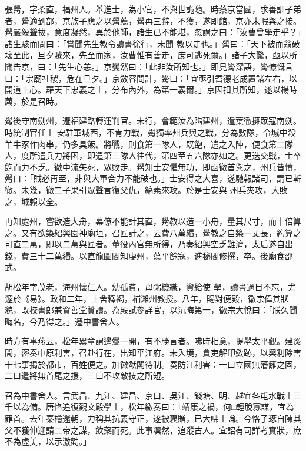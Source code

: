\begin{pinyinscope}
 張觷，字柔直，福州人。舉進士，為小官，不與世詭隨。時蔡京當國，求善訓子弟者，觷適到部，京族子應之以觷薦，觷再三辭，不獲，遂即館，京亦未暇與之接。觷嚴毅聳拔，意度凝然，異於他師，諸生已不能堪，忽謂之曰：「汝曹曾學走乎？」諸生駭而問曰：「嘗聞先生教令讀書徐行，未聞
 教以走也。」觷曰：「天下被而翁破壞至此，旦夕賊來，先至而家，汝曹惟有善走，庶可逃死爾。」諸子大驚，亟以所聞告京，曰：「先生心恙。」京矍然曰：「此非汝所知也。」即見觷深語，觷慷慨言曰：「宗廟社稷，危在旦夕。」京斂容問計，觷曰：「宜亟引耆德老成置諸左右，以開道上心。羅天下忠義之士，分布內外，為第一義爾。」京因扣其所知，遂以楊時薦，於是召時。



 觷後守南劍州，遷福建路轉運判官。未行，會範汝為陷建州，遣葉徹擁眾寇南劍。時統制官任士
 安駐軍城西，不肯力戰，觷獨率州兵與之戰，分為數隊，令城中殺羊牛豕作肉串，仍多具飯。將戰，則食第一隊人，既飽，遣之入陣，便食第二隊人，度所遣兵力將困，即遣第三隊人往代，第四至五六隊亦如之。更迭交戰，士卒飽而力不乏。徹中流矢死，眾敗走。觷知士安懼無功，即函徹首與之，州兵皆憤，觷曰：「賊必再至，非與大軍合力不能破也。」士安得之大喜，遂馳報諸司，謂已斬徹。未幾，徹二子果引眾聲言復父仇，縞素來攻。於是士安與
 州兵夾攻，大敗之，城賴以全。



 再知處州，嘗欲造大舟，幕僚不能計其直，觷教以造一小舟，量其尺寸，而十倍算之。又有欲築紹興園神廟垣，召匠計之，云費八萬緡，觷教之自築一丈長，約算之可直二萬，即以二萬與匠者。董役內官無所得，乃奏紹興空乏難濟，太后遂自出錢，費三十二萬緡。以直龍圖閣知虔州，蕩平餘寇，進秘閣修撰，卒。後廟食邵武。



 胡松年字茂老，海州懷仁人。幼孤貧，母粥機織，資給使
 學，讀書過目不忘，尤邃於《易》。政和二年，上舍釋褐，補濰州教授。八年，賜對便殿，徽宗偉其狀貌，改校書郎兼資善堂贊讀。為殿試參詳官，以沉晦第一，徽宗大悅曰：「朕久聞晦名，今乃得之。」遷中書舍人。



 時方有事燕云，松年累章謂邊釁一開，有不勝言者。咈時相意，提舉太平觀。建炎間，密奏中原利害，召赴行在，出知平江府。未入境，貪吏解印斂跡，以興利除害十七事揭於都市，百姓便之。加徽猷閣待制。奏防江利害：一曰立國無藩籬之固，
 二曰遣將無首尾之援，三曰不攻敵技之所短。



 召為中書舍人。言武昌、九江、建昌、京口、吳江、錢塘、明、越宜各屯水戰士三千以為備。唐恪追復觀文殿學士，松年繳奏曰：「靖康之禍，何□輕脫寡謀，宜為罪首。去年秦檜還朝，力稱其抗義守正，遂被褒贈，已大咈士論。今恪子琢自陳其父不獲伸迎請二帝之謀，飲藥而死。此事凜然，追蹤古人。宜詔有司詳考實狀，庶不為虛美，以示激勸。」




\end{pinyinscope}
